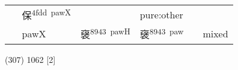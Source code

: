 \documentclass[14pt,a4paper]{scrartcl}
\begin{document}
\begin{longtable}[c]{@{}llllll@{}}
\begin{minipage}[t]{0.14\columnwidth}
\strut\end{minipage} &
\begin{minipage}[t]{0.14\columnwidth}\raggedright\strut
保\textsuperscript{4fdd~pawX}
\strut\end{minipage} &
\begin{minipage}[t]{0.14\columnwidth}\raggedright\strut
\strut\end{minipage} &
\begin{minipage}[t]{0.14\columnwidth}\raggedright\strut
pure:other
\strut\end{minipage}\tabularnewline
\begin{minipage}[t]{0.14\columnwidth}\raggedright\strut
𠊻
\strut\end{minipage} &
\begin{minipage}[t]{0.14\columnwidth}\raggedright\strut
pawX
\strut\end{minipage} &
\begin{minipage}[t]{0.14\columnwidth}\raggedright\strut
襃\textsuperscript{8943~pawH}
\strut\end{minipage} &
\begin{minipage}[t]{0.14\columnwidth}\raggedright\strut
襃\textsuperscript{8943~paw}
\strut\end{minipage} &
\begin{minipage}[t]{0.14\columnwidth}\raggedright\strut
\strut\end{minipage} &
\begin{minipage}[t]{0.14\columnwidth}\raggedright\strut
mixed
\strut\end{minipage}\tabularnewline
\bottomrule
\end{longtable}

(307) 1062 {[}2{]}
\end{document}
